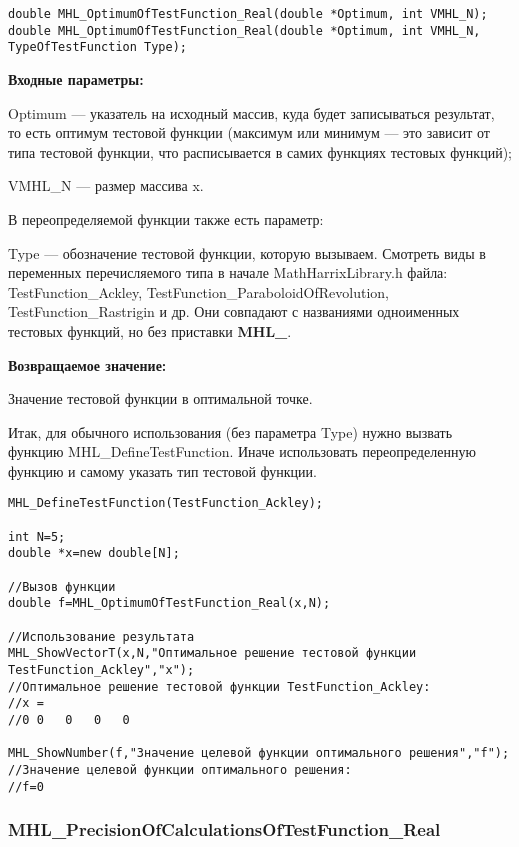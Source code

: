 \documentclass[a4paper,12pt]{article}
\begin{document}
\begin{lstlisting}[label=code_syntax_MHL_OptimumOfTestFunction_Real,caption=Синтаксис]
double MHL_OptimumOfTestFunction_Real(double *Optimum, int VMHL_N);
double MHL_OptimumOfTestFunction_Real(double *Optimum, int VMHL_N, TypeOfTestFunction Type);
\end{lstlisting}

\textbf{Входные параметры:}

Optimum --- указатель на исходный массив, куда будет записываться результат, то есть оптимум тестовой функции (максимум или минимум --- это зависит от типа тестовой функции, что расписывается в самих функциях тестовых функций);

     VMHL\_N --- размер массива x.

В переопределяемой функции также есть параметр:
  
Type --- обозначение тестовой функции, которую вызываем.
Смотреть виды в переменных перечисляемого типа в начале MathHarrixLibrary.h файла: TestFunction\_Ackley, TestFunction\_ParaboloidOfRevolution, TestFunction\_Rastrigin и др. Они совпадают с названиями одноименных тестовых функций, но без приставки \textbf{MHL\_}.

\textbf{Возвращаемое значение:}
 
Значение тестовой функции в оптимальной точке.

Итак, для обычного использования (без параметра Type) нужно вызвать функцию MHL\_DefineTestFunction. Иначе использовать переопределенную функцию и самому указать тип тестовой функции.


\begin{lstlisting}[label=code_use_MHL_OptimumOfTestFunction_Real,caption=Пример использования]
MHL_DefineTestFunction(TestFunction_Ackley);

int N=5;
double *x=new double[N];

//Вызов функции
double f=MHL_OptimumOfTestFunction_Real(x,N);

//Использование результата
MHL_ShowVectorT(x,N,"Оптимальное решение тестовой функции TestFunction_Ackley","x");
//Оптимальное решение тестовой функции TestFunction_Ackley:
//x =	
//0	0	0	0	0

MHL_ShowNumber(f,"Значение целевой функции оптимального решения","f");
//Значение целевой функции оптимального решения:
//f=0
\end{lstlisting}

\subsubsection{MHL\_PrecisionOfCalculationsOfTestFunction\_Real}\label{MHL_PrecisionOfCalculationsOfTestFunction_Real}
\end{document}
